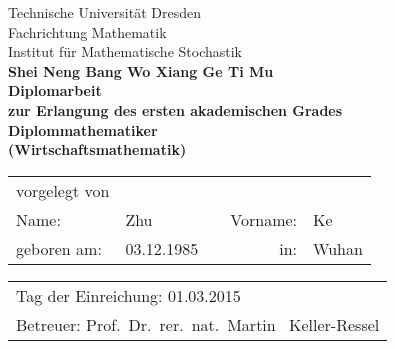 \begin{titlepage}
	\begin{center}
		\Huge
		Technische Universit\"at Dresden \\[-.4em]
		Fachrichtung Mathematik \\[.5em]
		\Large
		Institut f\"ur Mathematische Stochastik \\[4em]
		\bfseries\huge
		Shei Neng Bang Wo Xiang Ge Ti Mu \\[3em]
		\normalfont\Large
		Diplomarbeit \\
		zur Erlangung des ersten akademischen Grades \\[.5em]
		\bfseries\Large
		Diplommathematiker\\[.5em]
	  	\bfseries\Large
		(Wirtschaftsmathematik)\\[4em]
	\end{center}
	\large
	\begin{tabular}{lllrl}
		vorgelegt von & & & & \\[1.2em]
		Name: & Zhu & \hspace{1.5cm} & Vorname: & Ke \\[.5em]
		geboren am: & 03.12.1985 & & in: & Wuhan \\[3em]
	\end{tabular}
	\newline
	\begin{tabular}{l}
		Tag der Einreichung: \hspace{.5cm} 01.03.2015 \\[.5em]
		Betreuer: \hspace{.5cm} Prof.~Dr.~rer.~nat.~Martin ~Keller-Ressel
	\end{tabular}
\end{titlepage}
\thispagestyle{empty}
\mbox{}
